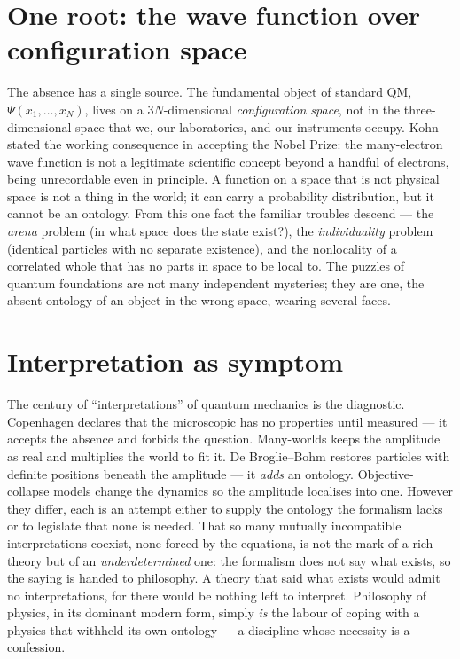 \documentclass[11pt]{article}
\begin{document}
\section{One root: the wave function over configuration space}

The absence has a single source. The fundamental object of standard QM, $\Psi(x_1,\dots,x_N)$, lives on a
$3N$-dimensional \emph{configuration space}, not in the three-dimensional space that we, our laboratories, and
our instruments occupy. Kohn stated the working consequence in accepting the Nobel Prize: the many-electron
wave function is not a legitimate scientific concept beyond a handful of electrons, being unrecordable even in
principle. A function on a space that is not physical space is not a thing in the world; it can carry a
probability distribution, but it cannot be an ontology. From this one fact the familiar troubles descend --- the
\emph{arena} problem (in what space does the state exist?), the \emph{individuality} problem (identical
particles with no separate existence), and the nonlocality of a correlated whole that has no parts in space to
be local to. The puzzles of quantum foundations are not many independent mysteries; they are one, the
absent ontology of an object in the wrong space, wearing several faces.

\section{Interpretation as symptom}

The century of ``interpretations'' of quantum mechanics is the diagnostic. Copenhagen declares that the
microscopic has no properties until measured --- it accepts the absence and forbids the question. Many-worlds
keeps the amplitude as real and multiplies the world to fit it. De Broglie--Bohm restores particles with
definite positions beneath the amplitude --- it \emph{adds} an ontology. Objective-collapse models change the
dynamics so the amplitude localises into one. However they differ, each is an attempt either to supply the
ontology the formalism lacks or to legislate that none is needed. That so many mutually incompatible
interpretations coexist, none forced by the equations, is not the mark of a rich theory but of an
\emph{underdetermined} one: the formalism does not say what exists, so the saying is handed to philosophy. A
theory that said what exists would admit no interpretations, for there would be nothing left to interpret.
Philosophy of physics, in its dominant modern form, simply \emph{is} the labour of coping with a physics that
withheld its own ontology --- a discipline whose necessity is a confession.
\end{document}
